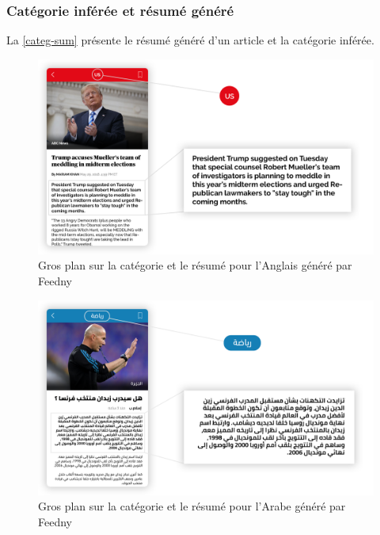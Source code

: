 \subsubsection{Catégorie inférée et résumé généré}
La \autoref{categ-sum} présente le résumé généré d'un article et la catégorie inférée.
\begin{figure}[H]
    \centering
    \includegraphics[width=410pt]{img/chapter4/feedny/en-summary.png}
    \caption{Gros plan sur la catégorie et le résumé pour l'Anglais généré par \textquotedbl Feedny\textquotedbl}
    \label{categ-sum}
\end{figure}

\begin{figure}[H]
    \centering
    \includegraphics[width=410pt]{img/chapter4/feedny/ar-summary.png}
    \caption{Gros plan sur la catégorie et le résumé pour l'Arabe généré par \textquotedbl Feedny\textquotedbl}
    \label{categ-sum}
\end{figure}


